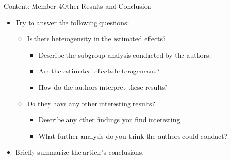 \documentclass[hyperref={pdfpagelabels=false}]{beamer}
\begin{document}
\begin{frame}{Content: Member 4}{Other Results and Conclusion}
	\begin{itemize}
		\item Try to answer the following questions:
															\vspace{0.2cm}
		\begin{itemize}
			\item Is there heterogeneity in the estimated effects?
																\vspace{0.2cm}
			\begin{itemize}
				\item Describe the subgroup analysis conducted by the authors.
																	\vspace{0.2cm}
				\item Are the estimated effects heterogeneous?
																	\vspace{0.2cm}
				\item How do the authors interpret these results?
																	\vspace{0.2cm}
			\end{itemize}
			\item Do they have any other interesting results?
																\vspace{0.2cm}
			\begin{itemize}
				\item Describe any other findings you find interesting.
																	\vspace{0.2cm}
				\item What further analysis do you think the authors could conduct?
																	\vspace{0.2cm}
			\end{itemize}
		\end{itemize}
		\item Briefly summarize the article's conclusions.
	\end{itemize}
\end{frame}
\end{document}
